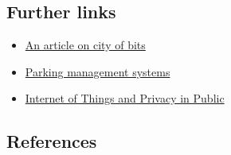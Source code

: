 \documentclass[
]{book}
\providecommand{\tightlist}{%
  \setlength{\itemsep}{0pt}\setlength{\parskip}{0pt}}
\begin{document}
\hypertarget{further-links-2}{%
\subsection*{Further links}\label{further-links-2}}

\begin{itemize}
\tightlist
\item
  \href{https://theconversation.com/surprise-digital-space-isnt-replacing-public-space-and-might-even-help-make-it-better-87173}{An article on city of bits}
\item
  \href{https://archer-soft.com/blog/how-build-real-time-parking-availability-system}{Parking management systems}
\item
  \href{https://jsis.washington.edu/news/internet-of-things-and-privacy-in-public/}{Internet of Things and Privacy in Public}
\end{itemize}

\hypertarget{references-3}{%
\subsection*{References}\label{references-3}}
\end{document}
